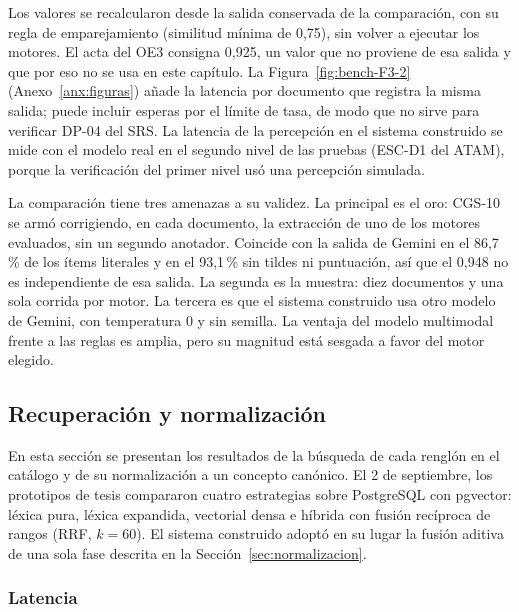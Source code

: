 Los valores se recalcularon desde la salida conservada de la comparación, con su regla de
emparejamiento (similitud mínima de 0,75), sin volver a ejecutar los motores. El acta del OE3 consigna 0,925, un valor que no proviene de
esa salida y que por eso no se usa en este capítulo. La Figura~\ref{fig:bench-F3-2} (Anexo~\ref{anx:figuras}) añade la latencia por documento que registra la misma
salida; puede incluir esperas por el límite de tasa, de modo que no sirve para verificar DP-04 del
SRS. La latencia de la percepción en el sistema construido se mide con el modelo real en el segundo
nivel de las pruebas (ESC-D1 del ATAM), porque la verificación del primer nivel usó una percepción
simulada.

La comparación tiene tres amenazas a su validez. La principal es el oro: CGS-10 se armó corrigiendo,
en cada documento, la extracción de uno de los motores evaluados, sin un segundo anotador. Coincide
con la salida de Gemini en el 86,7\,\% de los ítems literales y en el 93,1\,\% sin tildes ni
puntuación, así que el 0,948 no es independiente de esa salida. La segunda es la muestra: diez
documentos y una sola corrida por motor. La tercera es que el sistema construido usa otro modelo de
Gemini, con temperatura 0 y sin semilla. La ventaja del modelo multimodal frente a las reglas es
amplia, pero su magnitud está sesgada a favor del motor elegido.



\subsection{Recuperación y normalización}
\label{sec:recuperacion}

En esta sección se presentan los resultados de la búsqueda de cada renglón en el catálogo y de su
normalización a un concepto canónico.
El 2 de septiembre, los prototipos de tesis compararon cuatro estrategias sobre PostgreSQL con
pgvector: léxica pura, léxica expandida, vectorial densa e híbrida con fusión recíproca de rangos
(RRF, $k=60$). El sistema construido adoptó en su lugar la fusión aditiva de una sola fase
descrita en la Sección~\ref{sec:normalizacion}.

\subsubsection{Latencia}

